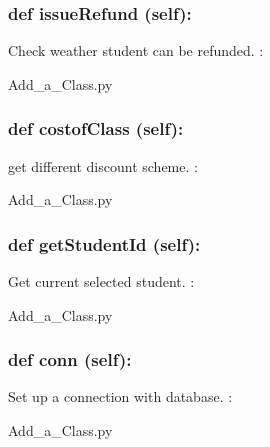 \hypertarget{class_poly_a14a7ad77ce612b0c54f531d307ee4b39}{
\subsubsection[{def issueRefund (self):}]{\setlength{\rightskip}{0pt plus 5cm}def {issueRefund} (self):}}\label{class_poly_a14a7ad77ce612b0c54f531d307ee4b39}
Check weather student can be refunded. 
:\begin{DoxyCompactItemize}
\item 
Add\_a\_Class.\-py\end{DoxyCompactItemize}

\hypertarget{class_poly_a14a7ad77ce612b0c54f531d307ee4b39}{
\subsubsection[{def costofClass (self):}]{\setlength{\rightskip}{0pt plus 5cm}def {costofClass} (self):}}\label{class_poly_a14a7ad77ce612b0c54f531d307ee4b39}
get different discount scheme. 
:\begin{DoxyCompactItemize}
\item 
Add\_a\_Class.\-py\end{DoxyCompactItemize}

\hypertarget{class_poly_a14a7ad77ce612b0c54f531d307ee4b39}{
\subsubsection[{def getStudentId (self):}]{\setlength{\rightskip}{0pt plus 5cm}def {getStudentId} (self):}}\label{class_poly_a14a7ad77ce612b0c54f531d307ee4b39}
Get current selected student.
:\begin{DoxyCompactItemize}
\item 
Add\_a\_Class.\-py\end{DoxyCompactItemize}

\hypertarget{class_poly_a14a7ad77ce612b0c54f531d307ee4b39}{
\subsubsection[{def conn (self):}]{\setlength{\rightskip}{0pt plus 5cm}def {conn} (self):}}\label{class_poly_a14a7ad77ce612b0c54f531d307ee4b39}
Set up a connection with database.
:\begin{DoxyCompactItemize}
\item 
Add\_a\_Class.\-py\end{DoxyCompactItemize}



